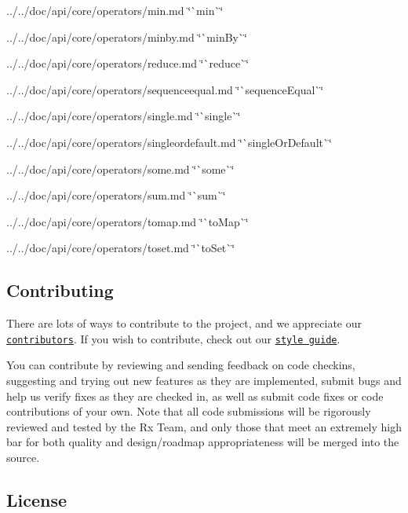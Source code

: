 \begin{DoxyItemize}
\item ../../doc/api/core/operators/min.md \char`\"{}\`{}min\`{}\char`\"{}
\item ../../doc/api/core/operators/minby.md \char`\"{}\`{}min\+By\`{}\char`\"{}
\item ../../doc/api/core/operators/reduce.md \char`\"{}\`{}reduce\`{}\char`\"{}
\item ../../doc/api/core/operators/sequenceequal.md \char`\"{}\`{}sequence\+Equal\`{}\char`\"{}
\item ../../doc/api/core/operators/single.md \char`\"{}\`{}single\`{}\char`\"{}
\item ../../doc/api/core/operators/singleordefault.md \char`\"{}\`{}single\+Or\+Default\`{}\char`\"{}
\item ../../doc/api/core/operators/some.md \char`\"{}\`{}some\`{}\char`\"{}
\item ../../doc/api/core/operators/sum.md \char`\"{}\`{}sum\`{}\char`\"{}
\item ../../doc/api/core/operators/tomap.md \char`\"{}\`{}to\+Map\`{}\char`\"{}
\item ../../doc/api/core/operators/toset.md \char`\"{}\`{}to\+Set\`{}\char`\"{}
\end{DoxyItemize}

\subsection*{Contributing}

There are lots of ways to contribute to the project, and we appreciate our \href{https://github.com/Reactive-Extensions/RxJS/wiki/Contributors}{\tt contributors}. If you wish to contribute, check out our \href{(https://github.com/Reactive-Extensions/RxJS/tree/master/doc/contributing)}{\tt style guide}.

You can contribute by reviewing and sending feedback on code checkins, suggesting and trying out new features as they are implemented, submit bugs and help us verify fixes as they are checked in, as well as submit code fixes or code contributions of your own. Note that all code submissions will be rigorously reviewed and tested by the Rx Team, and only those that meet an extremely high bar for both quality and design/roadmap appropriateness will be merged into the source.

\subsection*{License}

